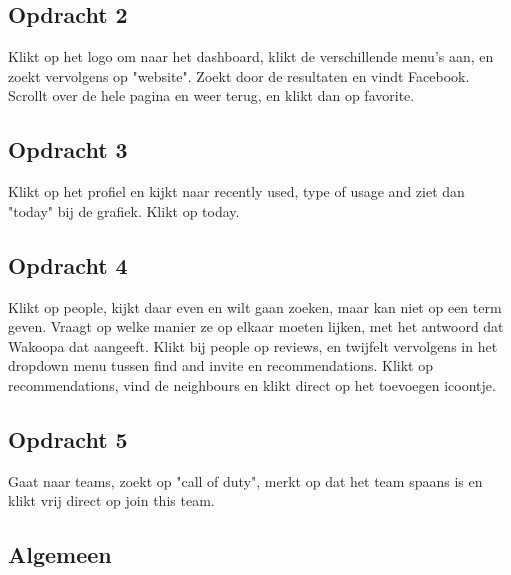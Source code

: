 \subsection{Opdracht 2}
Klikt op het logo om naar het dashboard, klikt de verschillende menu's aan, en zoekt vervolgens op "website". Zoekt door de resultaten en vindt Facebook. Scrollt over de hele pagina en weer terug, en klikt dan op favorite.

\subsection{Opdracht 3}
Klikt op het profiel en kijkt naar recently used, type of usage and ziet dan "today" bij de grafiek. Klikt op today.

\subsection{Opdracht 4}
Klikt op people, kijkt daar even en wilt gaan zoeken, maar kan niet op een term geven. Vraagt op welke manier ze op elkaar moeten lijken, met het antwoord dat Wakoopa dat aangeeft. Klikt bij people op reviews, en twijfelt vervolgens in het dropdown menu tussen find and invite en recommendations. Klikt op recommendations, vind de neighbours en klikt direct op het toevoegen icoontje.

\subsection{Opdracht 5}
Gaat naar teams, zoekt op "call of duty", merkt op dat het team spaans is en klikt vrij direct op join this team.

\subsection{Algemeen}
